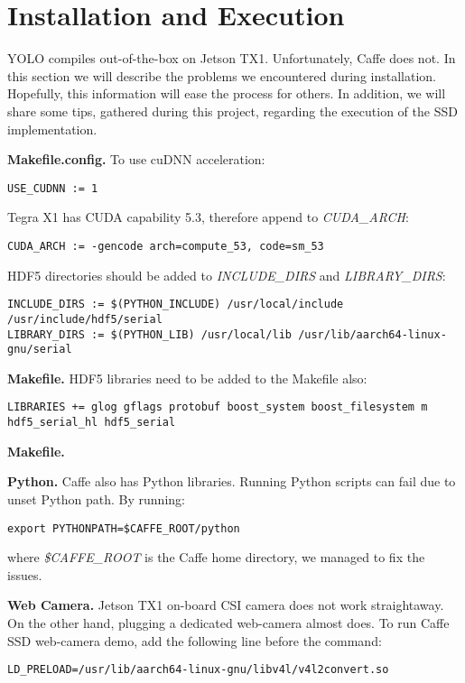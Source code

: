 \section{Installation and Execution}
\label{sec:installation}

YOLO compiles out-of-the-box on Jetson TX1. Unfortunately, Caffe does not. In this section we will describe the problems we encountered during installation. Hopefully, this information will ease the process for others. In addition, we will share some tips, gathered during this project, regarding the execution of the SSD implementation.

\textbf{Makefile.config.}
To use cuDNN acceleration:
\begin{lstlisting} 
USE_CUDNN := 1
\end{lstlisting}

Tegra X1 has CUDA capability 5.3, therefore append to \textit{CUDA\_ARCH}: 
\begin{lstlisting} 
CUDA_ARCH := -gencode arch=compute_53, code=sm_53
\end{lstlisting}

HDF5 directories should be added to \textit{INCLUDE\_DIRS} and \textit{LIBRARY\_DIRS}:
\begin{lstlisting} 
INCLUDE_DIRS := $(PYTHON_INCLUDE) /usr/local/include /usr/include/hdf5/serial
LIBRARY_DIRS := $(PYTHON_LIB) /usr/local/lib /usr/lib/aarch64-linux-gnu/serial
\end{lstlisting}

\textbf{Makefile.}
HDF5 libraries need to be added to the Makefile also:
\begin{lstlisting} 
LIBRARIES += glog gflags protobuf boost_system boost_filesystem m hdf5_serial_hl hdf5_serial
\end{lstlisting}

\textbf{Makefile.}

\textbf{Python.}
Caffe also has Python libraries. Running Python scripts can fail due to unset Python path. By running:
\begin{lstlisting} 
export PYTHONPATH=$CAFFE_ROOT/python
\end{lstlisting}
where \textit{\$CAFFE\_ROOT} is the Caffe home directory, we managed to fix the issues.

\textbf{Web Camera.}
Jetson TX1 on-board CSI camera does not work straightaway. On the other hand, plugging a dedicated web-camera almost does. To run Caffe SSD web-camera demo, add the following line before the command:
\begin{lstlisting} 
LD_PRELOAD=/usr/lib/aarch64-linux-gnu/libv4l/v4l2convert.so
\end{lstlisting}

